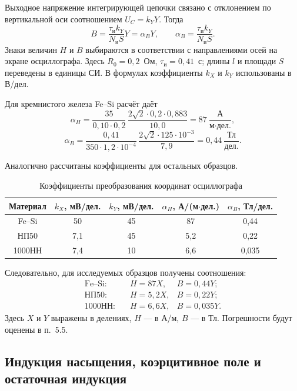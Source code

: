 \documentclass[12pt,a4paper]{article}
\begin{document}
Выходное напряжение интегрирующей цепочки связано с отклонением
по вертикальной оси соотношением $U_C=k_Y Y$. Тогда
\begin{equation}
 B=\frac{\tau_{\text{и}}k_Y}{N_{\text{и}}S}Y=\alpha_B Y,
 \qquad \alpha_B=\frac{\tau_{\text{и}}k_Y}{N_{\text{и}}S}.
 \label{eq:alphaB}
\end{equation}
Знаки величин $H$ и $B$ выбираются в соответствии с направлениями
осей на экране осциллографа. Здесь $R_0=0{,}2$~Ом,
$\tau_{\text{и}}=0{,}41$~с; длины $l$ и площади $S$ переведены
в единицы СИ. В формулах коэффициенты $k_X$ и $k_Y$
использованы в В/дел.

Для кремнистого железа Fe--Si расчёт даёт
\[
 \alpha_H=
 \frac{35}{0{,}10\cdot0{,}2}\,
 \frac{2\sqrt{2}\cdot0{,}2\cdot0{,}883}{10{,}0}
 =87\ \frac{\text{А}}{\text{м}\cdot\text{дел.}},
\]
\[
 \alpha_B=
 \frac{0{,}41}{350\cdot1{,}2\cdot10^{-4}}\,
 \frac{2\sqrt{2}\cdot125\cdot10^{-3}}{7{,}9}
 =0{,}44\ \frac{\text{Тл}}{\text{дел.}}.
\]

Аналогично рассчитаны коэффициенты для остальных образцов.
\begin{table}[H]
 \centering
 \caption{Коэффициенты преобразования координат осциллографа}
 \label{tab:coord_conversion}
 \small
 \setlength{\tabcolsep}{5pt}
 \begin{tabular}{|c|c|c|c|c|}
 \hline
 Материал & $k_X$, мВ/дел. & $k_Y$, мВ/дел. &
 $\alpha_H$, А/(м$\cdot$дел.) & $\alpha_B$, Тл/дел. \\
 \hline
 Fe--Si & 50 & 45 & 87 & 0,44 \\
 \hline
 НП50 & 7,1 & 45 & 5,2 & 0,22 \\
 \hline
 1000НН & 7,4 & 10 & 6,6 & 0,035 \\
 \hline
 \end{tabular}
\end{table}

Следовательно, для исследуемых образцов получены соотношения:
\begin{align*}
 \text{Fe--Si:}\quad &H=87X,   & B=0{,}44Y;\\
 \text{НП50:}\quad &H=5{,}2X, & B=0{,}22Y;\\
 \text{1000НН:}\quad &H=6{,}6X, & B=0{,}035Y.
\end{align*}
Здесь $X$ и $Y$ выражены в делениях, $H$ --- в А/м,
$B$ --- в Тл. Погрешности будут оценены в п.~5.5.

\subsection{Индукция насыщения, коэрцитивное поле и остаточная индукция}
\end{document}
